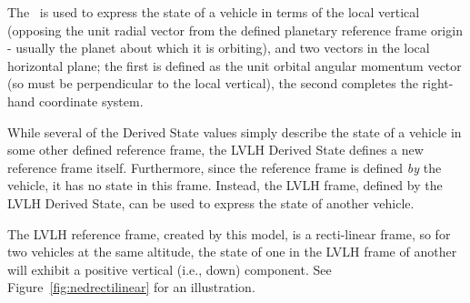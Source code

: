 %
%
% 
%



The \LVLHDesc\ is used to express the state of a vehicle in terms of the local vertical (opposing the unit radial vector from the defined planetary reference frame origin - usually the planet about which it is orbiting), and two vectors in the local horizontal plane; the first is defined as the unit orbital angular momentum vector (so must be perpendicular to the local vertical), the second completes the right-hand coordinate system.

While several of the Derived State values simply describe the state of a vehicle in some other defined reference frame, the LVLH Derived State defines a new reference frame itself.  Furthermore, since the reference frame is defined \textit{by} the vehicle, it has no state in this frame.  Instead, the LVLH frame, defined by the LVLH Derived State, can be used to express the state of another vehicle.

The LVLH reference frame, created by this model, is a recti-linear frame, so for two vehicles at the same altitude, the state of one in the LVLH frame of another will exhibit a positive vertical (i.e., down) component. See Figure~\vref{fig:nedrectilinear} for an illustration.













